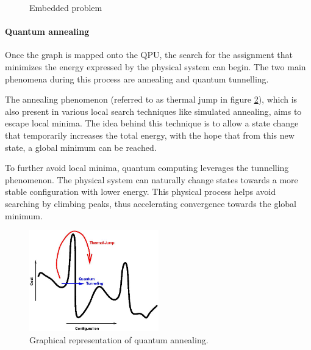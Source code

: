 \begin{figure}[H]
  \begin{center}
      \caption{Embedded problem}
      \label{fig:embedding}
  \end{center}
\end{figure}

\paragraph{Quantum annealing} 

Once the graph is mapped onto the QPU, the search for the assignment that minimizes the energy expressed by the physical system can begin. The two main phenomena during this process are annealing and quantum tunnelling.

The annealing phenomenon (referred to as thermal jump in figure \ref{fig:q-anneal}), which is also present in various local search techniques like simulated annealing\cite{SimulatedAnnealing}, aims to escape local minima. The idea behind this technique is to allow a state change that temporarily increases the total energy, with the hope that from this new state, a global minimum can be reached.

To further avoid local minima, quantum computing leverages the tunnelling phenomenon. The physical system can naturally change states towards a more stable configuration with lower energy. This physical process helps avoid searching by climbing peaks, thus accelerating convergence towards the global minimum.

\begin{figure}[H]
  \centering
  \includegraphics[width=0.5\textwidth]{figures/q-annealing.jpg}
  \caption{Graphical representation of quantum annealing.}
  \label{fig:q-anneal}
\end{figure}